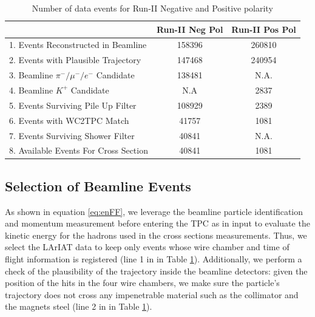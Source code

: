 \begin{table}[b]
\centering
\begin{tabular}{|l|c|c|}
\hline
                                                        & Run-II Neg Pol   &  Run-II Pos Pol  \\ \hline
1. Events Reconstructed in Beamline        &  158396  & 260810  \\ \hline
2. Events with Plausible Trajectory            &   147468 & 240954  \\ \hline
3. Beamline $\pi^-/\mu^-/e^-$  Candidate  &   138481 &     N.A.   \\ \hline
4. Beamline $K^+$   Candidate                 &    N.A       & 2837     \\ \hline
5. Events Surviving Pile Up Filter              &   108929  & 2389       \\ \hline
6. Events with WC2TPC Match                 &    41757   & 1081 \\ \hline
7. Events Surviving Shower Filter             &    40841    &  N.A.     \\ \hline
8. Available Events For Cross Section      &   40841    &   1081    \\ \hline
\end{tabular}
\caption{Number of data events for Run-II Negative and Positive polarity }
\label{tab:beamlineDataSelection}
\end{table}


\subsection{Selection of Beamline Events}\label{ch:beamlineDetectorsData}
As shown in equation \ref{eq:enFF}, we leverage the beamline particle identification and momentum measurement before entering the TPC as in input to evaluate the kinetic energy for the hadrons used in the  cross sections measurements. Thus, we select the LArIAT data to keep only events whose wire chamber and time of flight information is registered (line 1 in in Table \ref{tab:beamlineDataSelection}). Additionally, we perform a check of the plausibility of the trajectory inside the beamline detectors: given the position of the hits in the four wire chambers, we make sure the particle's trajectory does not cross any impenetrable material such as the collimator and the magnets steel (line 2 in in Table \ref{tab:beamlineDataSelection}).


